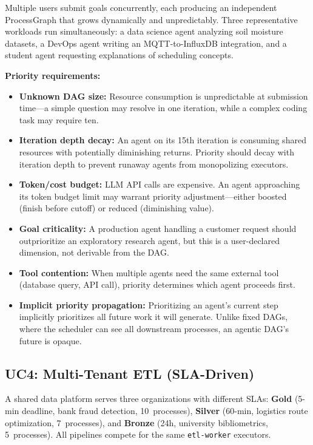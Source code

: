 \documentclass[conference]{IEEEtran}
\begin{document}
Multiple users submit goals concurrently, each producing an independent ProcessGraph that grows dynamically and unpredictably. Three representative workloads run simultaneously: a data science agent analyzing soil moisture datasets, a DevOps agent writing an MQTT-to-InfluxDB integration, and a student agent requesting explanations of scheduling concepts.

\textbf{Priority requirements:}
\begin{itemize}
    \item \textbf{Unknown DAG size:} Resource consumption is unpredictable at submission time---a simple question may resolve in one iteration, while a complex coding task may require ten.
    \item \textbf{Iteration depth decay:} An agent on its 15th iteration is consuming shared resources with potentially diminishing returns. Priority should decay with iteration depth to prevent runaway agents from monopolizing executors.
    \item \textbf{Token/cost budget:} LLM API calls are expensive. An agent approaching its token budget limit may warrant priority adjustment---either boosted (finish before cutoff) or reduced (diminishing value).
    \item \textbf{Goal criticality:} A production agent handling a customer request should outprioritize an exploratory research agent, but this is a user-declared dimension, not derivable from the DAG.
    \item \textbf{Tool contention:} When multiple agents need the same external tool (database query, API call), priority determines which agent proceeds first.
    \item \textbf{Implicit priority propagation:} Prioritizing an agent's current step implicitly prioritizes all future work it will generate. Unlike fixed DAGs, where the scheduler can see all downstream processes, an agentic DAG's future is opaque.
\end{itemize}

\subsection{UC4: Multi-Tenant ETL (SLA-Driven)}
\label{sec:uc4}

A shared data platform serves three organizations with different SLAs: \textbf{Gold} (5-min deadline, bank fraud detection, 10~processes), \textbf{Silver} (60-min, logistics route optimization, 7~processes), and \textbf{Bronze} (24h, university bibliometrics, 5~processes). All pipelines compete for the same \texttt{etl-worker} executors.
\end{document}
